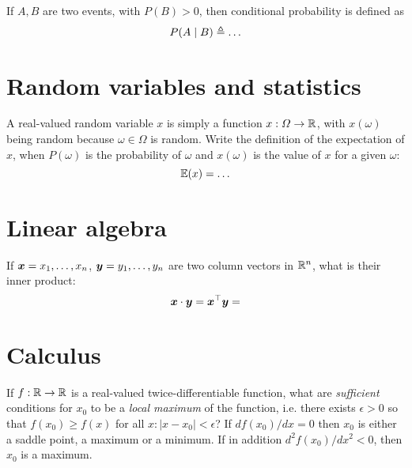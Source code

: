 \documentclass[a4paper]{article}
\begin{document}
\begin{exercise}
  If $A, B$ are two events, with $P(B) > 0$, then conditional probability is defined as
  \[
  P(A \mid B) \defn 
  \ifdefined \solution
  \frac{P(A \cap B)}{P(B)}
  \else
  \ldots
  \fi
  \]
\end{exercise}


\section{Random variables and statistics}


\begin{exercise}
  A real-valued random variable $x$ is simply a function
  $x : \Omega \to {\mathbb{R}}$, with $x(\omega)$ being random because
  $\omega \in \Omega$ is random.  Write the definition of the
  expectation of $x$, when $P(\omega)$ is the probability of $\omega$ and
  $x(\omega)$ is the value of $x$ for a given $\omega$:
  \[
  \E(x) = 
  \ifdefined \solution
  \sum_{\omega \in \Omega} x(\omega) P(\omega) 
  \else
  \ldots
  \fi
  \]
\end{exercise}



\section{Linear algebra}

\begin{exercise}
  If $\bx = x_1, \ldots, x_n$, $\by = y_1, \ldots, y_n$ are two column vectors in ${\mathbb{R}}^n$, what is their inner product:
  \[
  \bx \cdot \by = \bx^\top \by = 
  \ifdefined \solution
  \sum_{i=1}^n x_i y_i
  \fi
  \]
\end{exercise}


\section{Calculus}

\begin{exercise}
  If $f : {\mathbb{R}} \to {\mathbb{R}}$ is a real-valued twice-differentiable function, what are \emph{sufficient} conditions for $x_0$ to be a \emph{local maximum} of the function, i.e. there exists $\epsilon > 0$ so that $f(x_0) \geq f(x)$ for all $x : |x - x_0| < \epsilon$?
\ifdefined\solution
If $d f(x_0) /dx  = 0$ then
$x_0$ is either a saddle point, a maximum or a minimum. If in addition $d^2 f(x_0) /dx^2 < 0$, then $x_0$ is a maximum.
\fi
\end{exercise}
\end{document}
